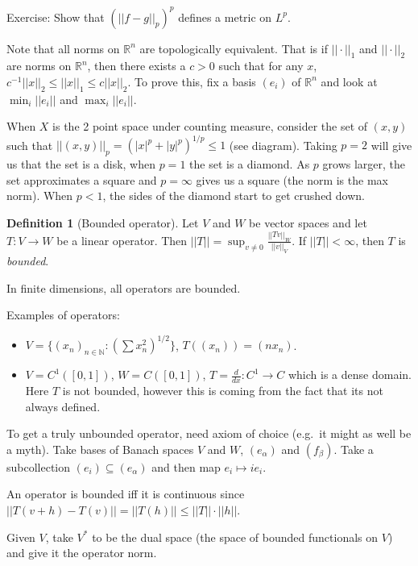 \documentclass{article}
\theoremstyle{definition}
\newtheorem{definition}[theorem]{Definition}
\begin{document}
Exercise: Show that \({(||f-g||_p)}^p\) defines a metric on \(L^p\).

Note that all norms on \(\mathbb{R}^n\) are topologically equivalent. That is if \(||\cdot||_1\) and \(||\cdot||_2\) are norms
on \(\mathbb{R}^n\), then there exists a \(c>0\) such that for any \(x\), \(c^{-1}||x||_2\leq||x||_1\leq c||x||_2\). To prove
this, fix a basis \((e_i)\) of \(\mathbb{R}^n\) and look at \(\min_i ||e_i||\) and \(\max_i ||e_i||\).

When \(X\) is the 2 point space under counting measure, consider the set of \( (x,y)\) such that
\(||(x,y)||_p={(|x|^p+|y|^p)}^{1/p}\leq 1\) (see diagram). Taking \(p=2\) will give us that the set is a disk, when
\(p=1\) the set is a diamond. As \(p\) grows larger, the set approximates a square and \(p=\infty\) gives us a square
(the norm is the max norm). When \(p<1\), the sides of the diamond start to get crushed down.

\begin{definition}[Bounded operator]
    Let \(V\) and \(W\) be vector spaces and let \(T:V\rightarrow W\) be a linear operator. Then
    \(||T||=\sup_{v\neq 0} \frac{||Tv||_W}{||v||_V}\). If \(||T||<\infty \), then \(T\) is \textit{bounded}.
\end{definition}

In finite dimensions, all operators are bounded.

Examples of operators: 
\begin{itemize}
    \item \(V=\{{(x_n)}_{n\in\mathbb{N}}: {\left(\sum x_n^2\right)}^{1/2}\} \), \(T((x_n))=(nx_n)\).
    \item \(V=C^1([0,1])\), \(W=C([0,1])\), \(T=\frac{d}{dx}:C^1\rightarrow C\) which is a dense domain. Here \(T\) is
    not bounded, however this is coming from the fact that its not always defined.
\end{itemize}

To get a truly unbounded operator, need axiom of choice (e.g.\ it might as well be a myth). Take bases of Banach spaces
\(V\) and \(W\), \((e_\alpha)\) and \((f_\beta)\). Take a subcollection \((e_i)\subseteq (e_\alpha)\) and then map
\(e_i\mapsto ie_i\).

An operator is bounded iff it is continuous since \(||T(v+h)-T(v)||=||T(h)||\leq ||T||\cdot ||h||\).

Given \(V\), take \(V^*\) to be the dual space (the space of bounded functionals on \(V\)) and give it the operator
norm.
\end{document}

